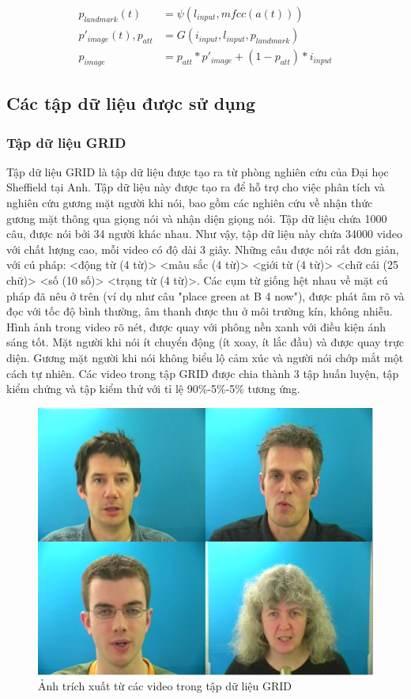 \begin{equation}
    \begin{split}
    p_{landmark}(t) &= \psi(l_{input}, mfcc(a(t)))\\
    p'_{image}(t), p_{att} &= G(i_{input}, l_{input}, p_{landmark})\\
    p_{image} &= p_{att}*p'_{image}+(1-p_{att})*i_{input}
    \end{split}
\end{equation}

\subsection{Các tập dữ liệu được sử dụng}
\subsubsection{Tập dữ liệu GRID \cite{grid}}

Tập dữ liệu GRID là tập dữ liệu được tạo ra từ phòng nghiên cứu của Đại học Sheffield tại Anh. Tập dữ liệu này được tạo ra để hỗ trợ cho việc phân tích và nghiên cứu gương mặt người khi nói, bao gồm các nghiên cứu về nhận thức gương mặt thông qua giọng nói và nhận diện giọng nói. Tập dữ liệu chứa 1000 câu, được nói bởi 34 người khác nhau. Như vậy, tập dữ liệu này chứa 34000 video với chất lượng cao, mỗi video có độ dài 3 giây. Những câu được nói rất đơn giản, với cú pháp: <động từ (4 từ)> <màu sắc (4 từ)> <giới từ (4 từ)> <chữ cái (25 chữ)> <số (10 số)> <trạng từ (4 từ)>. Các cụm từ giống hệt nhau về mặt cú pháp đã nêu ở trên (ví dụ như câu "place green at B 4 now"), được phát âm rõ và đọc với tốc độ bình thường, âm thanh được thu ở môi trường kín, không nhiễu. Hình ảnh trong video rõ nét, được quay với phông nền xanh với điều kiện ánh sáng tốt. Mặt người khi nói ít chuyển động (ít xoay, ít lắc đầu) và được quay trực diện. Gương mặt người khi nói không biểu lộ cảm xúc và người nói chớp mắt một cách tự nhiên. Các video trong tập GRID được chia thành 3 tập huấn luyện, tập kiểm chứng và tập kiểm thử với tỉ lệ 90\%-5\%-5\% tương ứng.

\begin{figure}[H]
    \centering
    \includegraphics[width=12cm]{./content/materials/grid.png}
    \caption{Ảnh trích xuất từ các video trong tập dữ liệu GRID}
\end{figure}

